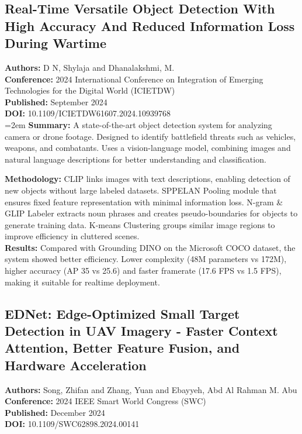 \subsection{Real-Time Versatile Object Detection With High Accuracy And Reduced Information Loss
  During Wartime}
\textbf{Authors:} D N, Shylaja and Dhanalakshmi, M. \\
\textbf{Conference:} 2024 International Conference on Integration of Emerging Technologies for the
Digital World (ICIETDW) \\
\textbf{Published:} September 2024 \\
\textbf{DOI:} 10.1109/ICIETDW61607.2024.10939768 \\

\begingroup\emergencystretch=2em
  \textbf{Summary:} A state-of-the-art object detection system for analyzing camera or drone
  footage. Designed to identify battlefield threats such as vehicles, weapons, and combatants. Uses
  a vision-language model, combining images and natural language descriptions for better
  understanding and classification. \\
\par\endgroup

\textbf{Methodology:} CLIP links images with text descriptions, enabling detection of new objects
without large labeled datasets. SPPELAN Pooling module that ensures fixed feature representation
with minimal information loss. N-gram \& GLIP Labeler extracts noun phrases and creates
pseudo-boundaries for objects to generate training data. K-means Clustering groups similar image
regions to improve efficiency in cluttered scenes. \\

\textbf{Results:} Compared with Grounding DINO on the Microsoft COCO dataset, the system showed
better efficiency. Lower complexity (48M parameters vs 172M), higher accuracy (AP 35 vs 25.6) and
faster framerate (17.6 FPS vs 1.5 FPS), making it suitable for realtime deployment.

\subsection{EDNet: Edge-Optimized Small Target Detection in UAV Imagery - Faster Context Attention,
  Better Feature Fusion, and Hardware Acceleration}
\textbf{Authors:} Song, Zhifan and Zhang, Yuan and Ebayyeh, Abd Al Rahman M. Abu \\
\textbf{Conference:} 2024 IEEE Smart World Congress (SWC) \\
\textbf{Published:} December 2024 \\
\textbf{DOI:} 10.1109/SWC62898.2024.00141 \\


